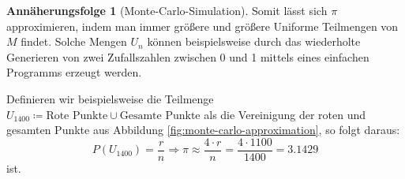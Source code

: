 \documentclass{scrartcl}
\theoremstyle{definition}
\newtheorem{approximation sequence}{Annäherungsfolge}
\begin{document}
\begin{approximation sequence}[Monte-Carlo-Simulation]
Somit lässt sich \(\pi\) approximieren, indem man immer größere und größere
Uniforme Teilmengen von \(M\) findet. Solche Mengen \(U_n\) können
beispielsweise durch das wiederholte Generieren von zwei Zufallszahlen zwischen
0 und 1 mittels eines einfachen Programms erzeugt werden.

Definieren wir beispielsweise die Teilmenge \(U_{1400} \coloneq \text{Rote
Punkte} \cup \text{Gesamte Punkte}\) als die Vereinigung der roten und gesamten
Punkte aus Abbildung \autoref{fig:monte-carlo-approximation}, so folgt daraus:
\begin{equation}
    P(U_{1400})
    = \frac{r}{n} \Rightarrow \pi \approx \frac{4 \cdot r}{n}
    = \frac{4 \cdot 1100}{1400} = 3.1429
\end{equation}
ist.

\end{approximation sequence}
\end{document}
